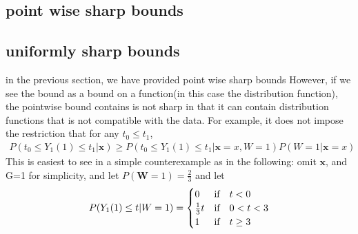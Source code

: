 \documentclass{article}
\begin{document}
     
























\subsection{point wise sharp bounds}
\subsection{uniformly sharp bounds}
in the previous section, we have provided point wise sharp bounds
However, if we see the bound as a bound on a function(in this case the distribution function), the pointwise bound contains is not sharp in that it can contain distribution functions that is not compatible with the data. 
For example, it does not impose the restriction that for any $ t_0 \le t_1$, 
\begin{align}
\label{eq: partial id necc dist sharp}
    P( t_0 \leq Y_1(1) \leq t_1 | \mathbf{x} ) \geq P ( t_0 \leq Y_1(1) \leq t_1 | \mathbf{x} = x, W = 1) P ( W =1 | \mathbf{x} = x)
\end{align}
This is easiest to see in a simple counterexample as in the following: 
omit $\mathbf{x}$, and G=1 for simplicity, and let $P ( \mathbf{W} = 1 ) = \frac{2}{3} $ and let 
\begin{align}
    P (Y_1(1) \leq t | W=1)=
    \begin{cases}
    0&\text{if}\quad t<0\\
    \frac{1}{3}t&\text{if}\quad 0< t< 3\\
    1 & \text{if}\quad t \geq 3
    \end{cases}
\end{align}
\end{document}
